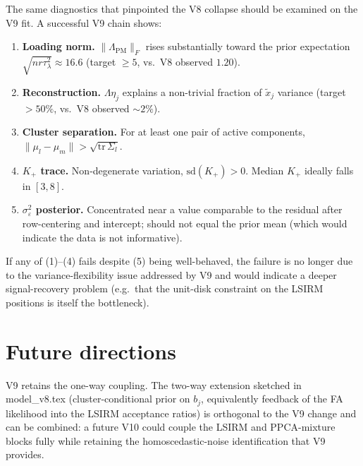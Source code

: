 \documentclass[11pt]{article}
\begin{document}
The same diagnostics that pinpointed the V8 collapse should be examined
on the V9 fit. A successful V9 chain shows:

\begin{enumerate}[leftmargin=2em]
    \item \textbf{Loading norm.} $\|\Lambda_{\mathrm{PM}}\|_F$ rises substantially toward the prior expectation $\sqrt{n r\tau_\lambda^2}\approx 16.6$ (target $\geq 5$, vs.\ V8 observed $1.20$).
    \item \textbf{Reconstruction.} $\Lambda\eta_j$ explains a non-trivial fraction of $\widetilde x_j$ variance (target $> 50\%$, vs.\ V8 observed $\sim 2\%$).
    \item \textbf{Cluster separation.} For at least one pair of active components, $\|\mu_l-\mu_m\|>\sqrt{\mathrm{tr}\,\Sigma_l}$.
    \item \textbf{$K_+$ trace.} Non-degenerate variation, $\mathrm{sd}(K_+)>0$. Median $K_+$ ideally falls in $[3,8]$.
    \item \textbf{$\sigma_\varepsilon^2$ posterior.} Concentrated near a value comparable to the residual after row-centering and intercept; should not equal the prior mean (which would indicate the data is not informative).
\end{enumerate}

If any of (1)--(4) fails despite (5) being well-behaved, the failure is no
longer due to the variance-flexibility issue addressed by V9 and would
indicate a deeper signal-recovery problem (e.g.\ that the unit-disk constraint
on the LSIRM positions is itself the bottleneck).

\section{Future directions}

V9 retains the one-way coupling. The two-way extension sketched in
model\_v8.tex (cluster-conditional prior on $b_j$, equivalently feedback
of the FA likelihood into the LSIRM acceptance ratios) is orthogonal to the
V9 change and can be combined: a future V10 could couple the LSIRM and
PPCA-mixture blocks fully while retaining the homoscedastic-noise
identification that V9 provides.
\end{document}
